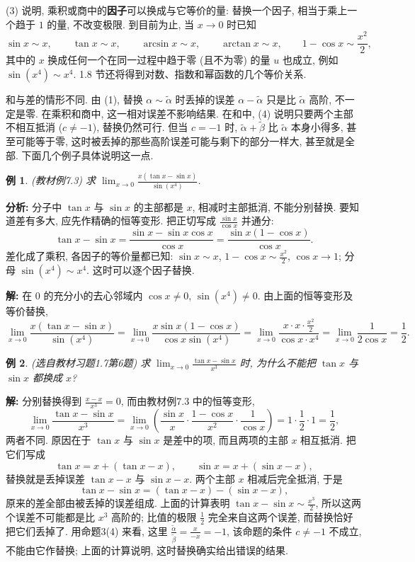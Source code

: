 \documentclass[UTF8,openany]{ctexbook}
\theoremstyle{chinesetextbook}
\newtheorem{example}{例}[section]
\newenvironment{cnsolution}{\par\indent\textbf{解:} \ignorespaces}{\par}
\begin{document}
(3) 说明, 乘积或商中的\textbf{因子}可以换成与它等价的量: 替换一个因子, 相当于乘上一个趋于 $1$ 的量, 不改变极限. 到目前为止, 当 $x\to0$ 时已知
\[
\sin x\sim x,\qquad\tan x\sim x,\qquad\arcsin x\sim x,\qquad\arctan x\sim x,\qquad1-\cos x\sim\frac{x^2}2,
\]
其中的 $x$ 换成任何一个在同一过程中趋于零 (且不为零) 的量 $u$ 也成立, 例如 $\sin(x^4)\sim x^4$. 1.8 节还将得到对数、指数和幂函数的几个等价关系.

和与差的情形不同. 由 (1), 替换 $\alpha\sim\widetilde\alpha$ 时丢掉的误差 $\alpha-\widetilde\alpha$ 只是比 $\widetilde\alpha$ 高阶, 不一定是零. 在乘积和商中, 这一相对误差不影响结果. 在和中, (4) 说明只要两个主部不相互抵消 ($c\ne-1$), 替换仍然可行. 但当 $c=-1$ 时, $\widetilde\alpha+\widetilde\beta$ 比 $\widetilde\alpha$ 本身小得多, 甚至可能等于零, 这时被丢掉的那些高阶误差可能与剩下的部分一样大, 甚至就是全部. 下面几个例子具体说明这一点.
\begin{example}
\textnormal{(教材例7.3)} 求 $\displaystyle\lim_{x\to0}\frac{x(\tan x-\sin x)}{\sin(x^4)}$.
\end{example}
\par\indent\textbf{分析:} 分子中 $\tan x$ 与 $\sin x$ 的主部都是 $x$, 相减时主部抵消, 不能分别替换. 要知道差有多大, 应先作精确的恒等变形. 把正切写成 $\displaystyle\frac{\sin x}{\cos x}$ 并通分:
\[
\tan x-\sin x=\frac{\sin x-\sin x\cos x}{\cos x}=\frac{\sin x(1-\cos x)}{\cos x}.
\]
差化成了乘积, 各因子的等价量都已知: $\sin x\sim x$, $\displaystyle1-\cos x\sim\frac{x^2}2$, $\cos x\to1$; 分母 $\sin(x^4)\sim x^4$. 这时可以逐个因子替换.
\begin{cnsolution}
在 $0$ 的充分小的去心邻域内 $\cos x\ne0$, $\sin(x^4)\ne0$. 由上面的恒等变形及等价替换,
\[
\lim_{x\to0}\frac{x(\tan x-\sin x)}{\sin(x^4)}=\lim_{x\to0}\frac{x\sin x(1-\cos x)}{\cos x\sin(x^4)}=\lim_{x\to0}\frac{x\cdot x\cdot\frac{x^2}2}{\cos x\cdot x^4}=\lim_{x\to0}\frac1{2\cos x}=\frac12.
\]
\end{cnsolution}
\begin{example}
\textnormal{(选自教材习题1.7第6题)} 求 $\displaystyle\lim_{x\to0}\frac{\tan x-\sin x}{x^3}$ 时, 为什么不能把 $\tan x$ 与 $\sin x$ 都换成 $x$?
\end{example}
\begin{cnsolution}
分别替换得到 $\displaystyle\frac{x-x}{x^3}=0$, 而由教材例7.3 中的恒等变形,
\[
\lim_{x\to0}\frac{\tan x-\sin x}{x^3}=\lim_{x\to0}\left(\frac{\sin x}x\cdot\frac{1-\cos x}{x^2}\cdot\frac1{\cos x}\right)=1\cdot\frac12\cdot1=\frac12,
\]
两者不同. 原因在于 $\tan x$ 与 $\sin x$ 是差中的项, 而且两项的主部 $x$ 相互抵消. 把它们写成
\[
\tan x=x+(\tan x-x),\qquad\sin x=x+(\sin x-x),
\]
替换就是丢掉误差 $\tan x-x$ 与 $\sin x-x$. 两个主部 $x$ 相减后完全抵消, 于是
\[
\tan x-\sin x=(\tan x-x)-(\sin x-x),
\]
原来的差全部由被丢掉的误差组成. 上面的计算表明 $\displaystyle\tan x-\sin x\sim\frac{x^3}2$, 所以这两个误差不可能都是比 $x^3$ 高阶的; 比值的极限 $\displaystyle\frac12$ 完全来自这两个误差, 而替换恰好把它们丢掉了. 用命题3(4) 来看, 这里 $\displaystyle\frac{\widetilde\alpha}{\widetilde\beta}=\frac x{-x}=-1$, 该命题的条件 $c\ne-1$ 不成立, 不能由它作替换; 上面的计算说明, 这时替换确实给出错误的结果.
\end{cnsolution}
\end{document}
